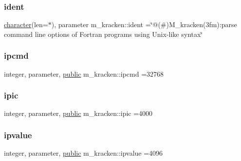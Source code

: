 \subsubsection{\texorpdfstring{ident}{ident}}
{\footnotesize\ttfamily \hyperlink{option__stopwatch_83_8txt_abd4b21fbbd175834027b5224bfe97e66}{character}(len=$\ast$), parameter m\+\_\+kracken\+::ident =\char`\"{}@(\#)M\+\_\+kracken(3fm)\+:parse command line options of Fortran programs using Unix-\/like syntax\char`\"{}}

\mbox{\label{namespacem__kracken_aa2cfa3076819f58387ffb774620027c2}} 
\subsubsection{\texorpdfstring{ipcmd}{ipcmd}}
{\footnotesize\ttfamily integer, parameter, \hyperlink{M__stopwatch_83_8txt_a2f74811300c361e53b430611a7d1769f}{public} m\+\_\+kracken\+::ipcmd =32768}

\mbox{\label{namespacem__kracken_a447be9e6b10e207b63049215d9274774}} 
\subsubsection{\texorpdfstring{ipic}{ipic}}
{\footnotesize\ttfamily integer, parameter, \hyperlink{M__stopwatch_83_8txt_a2f74811300c361e53b430611a7d1769f}{public} m\+\_\+kracken\+::ipic =4000}

\mbox{\label{namespacem__kracken_a9e71724677cede703e1fb186e446349f}} 
\subsubsection{\texorpdfstring{ipvalue}{ipvalue}}
{\footnotesize\ttfamily integer, parameter, \hyperlink{M__stopwatch_83_8txt_a2f74811300c361e53b430611a7d1769f}{public} m\+\_\+kracken\+::ipvalue =4096}

\mbox{\label{namespacem__kracken_adda44fb0845c3cec44bc5a5bb258b395}} 
